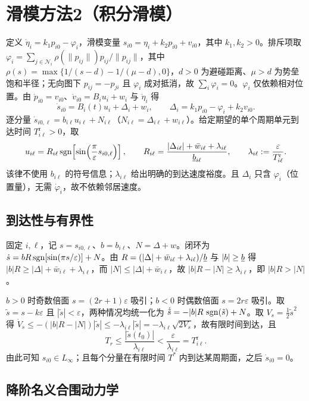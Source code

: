\section{滑模方法2（积分滑模）}

定义 $\dot\eta_i=k_1p_{i0}-\varphi_i$，滑模变量 $s_{i0}=\eta_i+k_2p_{i0}+v_{i0}$，其中 $k_1,k_2>0$。排斥项取 $\varphi_i=\sum_{j\in\mathcal N_i}\rho(\|p_{ij}\|)p_{ij}/\|p_{ij}\|$，其中 $\rho(s)=\max\{1/(s-d)-1/(\mu-d),0\}$，$d>0$ 为避碰距离、$\mu>d$ 为势垒饱和半径；无向图下 $p_{ij}=-p_{ji}$ 且 $\varphi_i$ 成对抵消，故 $\sum_i\varphi_i=0$。$\varphi_i$ 仅依赖相对位置。由 $\dot p_{i0}=v_{i0}$、$\dot v_{i0}=B_iu_i+w_i$ 与 $\dot\eta_i$ 得
\[
    \dot s_{i0}=B_i(t)u_i+\Delta_i+w_i,\qquad
    \Delta_i=k_1p_{i0}-\varphi_i+k_2v_{i0}.
\]
逐分量 $\dot s_{i0,\ell}=b_{i\ell}u_{i\ell}+N_{i\ell}$（$N_{i\ell}=\Delta_{i\ell}+w_{i\ell}$）。给定期望的单个周期单元到达时间 $T^{\mathrm r}_{i\ell}>0$，取
\[
    u_{i\ell}=R_{i\ell}\operatorname{sgn}\!\left[\sin\!\left(\frac{\pi}{\varepsilon}s_{i0,\ell}\right)\right],\qquad
    R_{i\ell}=\frac{|\Delta_{i\ell}|+\bar w_{i\ell}+\lambda_{i\ell}}{\underline{b}_{i\ell}},
    \qquad
    \lambda_{i\ell}:=\frac{\varepsilon}{T^{\mathrm r}_{i\ell}}.
\]
该律不使用 $b_{i\ell}$ 的符号信息；$\lambda_{i\ell}$ 给出明确的到达速度裕度。且 $\Delta_i$ 只含 $\varphi_i$（位置量），无需 $\dot\varphi_i$，故不依赖邻居速度。

\subsection{到达性与有界性}

固定 $i,\ell$，记 $s=s_{i0,\ell}$、$b=b_{i\ell}$、$N=\Delta+w$。闭环为 $\dot s=bR\operatorname{sgn}[\sin(\pi s/\varepsilon)]+N$。由 $R=(|\Delta|+\bar w_{i\ell}+\lambda_{i\ell})/\underline{b}$ 与 $|b|\ge\underline{b}$ 得 $|b|R\ge|\Delta|+\bar w_{i\ell}+\lambda_{i\ell}$，而 $|N|\le|\Delta|+\bar w_{i\ell}$，故 $|b|R-|N|\ge\lambda_{i\ell}$，即 $|b|R>|N|$。

$b>0$ 时奇数倍面 $s=(2r+1)\varepsilon$ 吸引；$b<0$ 时偶数倍面 $s=2r\varepsilon$ 吸引。取 $\tilde s=s-k\varepsilon$ 且 $|\tilde s|<\varepsilon$，两种情况均统一化为 $\dot{\tilde s}=-|b|R\,\operatorname{sgn}(\tilde s)+N$。取 $V_s=\tfrac12\tilde s^2$ 得 $\dot V_s\le-(|b|R-|N|)|\tilde s|\le-\lambda_{i\ell}|\tilde s|=-\lambda_{i\ell}\sqrt{2V_s}$，故有限时间到达，且
\[
    T_r\le\frac{|\tilde s(t_0)|}{\lambda_{i\ell}}
    <\frac{\varepsilon}{\lambda_{i\ell}}=T^{\mathrm r}_{i\ell}.
\]
由此可知 $s_{i0}\in L_\infty$；且每个分量在有限时间 $T^*$ 内到达某周期面，之后 $\dot s_{i0}=0$。

\subsection{降阶名义合围动力学}


